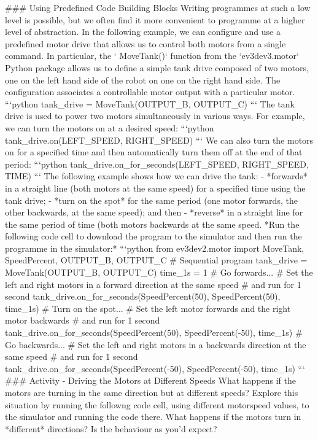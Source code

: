 \documentclass[letterpaper,10pt,english]{sphinxmanual}
\begin{document}
{### Using Predefined Code Building Blocks
Writing programmes at such a low level is possible, but we often find it more convenient to programme at a higher level of abstraction. In the following example, we can configure and use a predefined motor drive that allows us to control both motors from a single command.
In particular, the ` MoveTank()` function from the `ev3dev3.motor` Python package allows us to define a simple tank drive composed of two motors, one on the left hand side of the robot on one on the right hand side. The configuration associates a controllable motor output with a particular motor.
```python
tank_drive = MoveTank(OUTPUT_B, OUTPUT_C)
```
The tank drive is used to power two motors simultaneously in various ways. For example, we can turn the motors on at a desired speed:
```python
tank_drive.on(LEFT_SPEED, RIGHT_SPEED)
```
We can also turn the motors on for a specified time and then automatically turn them off at the end of that period:
```python
tank_drive.on_for_seconds(LEFT_SPEED, RIGHT_SPEED, TIME)
```
The following example shows how we can drive the tank:
- *forwards* in a straight line (both motors at the same speed) for a specified time using the tank drive;
- *turn on the spot* for the same period (one motor forwards, the other backwards, at the same speed); and then
- *reverse* in a straight line for the same period of time (both motors backwards at the same speed.
*Run the following code cell to download the program to the simulator and then run the programme in the simulator:*
```python
from ev3dev2.motor import MoveTank, SpeedPercent, OUTPUT_B, OUTPUT_C
# Sequential program
tank_drive = MoveTank(OUTPUT_B, OUTPUT_C)
time_1s = 1
# Go forwards...
# Set the left and right motors in a forward direction at the same speed
# and run for 1 second
tank_drive.on_for_seconds(SpeedPercent(50), SpeedPercent(50), time_1s)
# Turn on the spot...
# Set the left motor forwards and the right motor backwards
# and run for 1 second
tank_drive.on_for_seconds(SpeedPercent(50), SpeedPercent(-50), time_1s)
# Go backwards...
# Set the left and right motors in a backwards direction at the same speed
# and run for 1 second
tank_drive.on_for_seconds(SpeedPercent(-50), SpeedPercent(-50), time_1s)
```
### Activity - Driving the Motors at Different Speeds
What happens if the motors are turning in the same direction but at different speeds? Explore this situation by running the followng code cell, using different motorspeed values, to the simulator and running the code there.
What happens if the motors turn in *different* directions? Is the behaviour as you'd expect?
}
\end{document}
